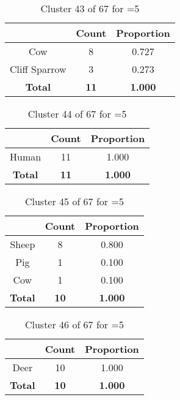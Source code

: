 \begin{table}[ht!]
\centering
\begin{tabular}{|c|c|c|}
\hline
\bf \Spec{} &\bf Count &\bf Proportion\\ \hline \hline
Cow & 8 & 0.727\\ \hline
Cliff Sparrow & 3 & 0.273\\ \hline
\hline
\bf Total & \bf 11 & \bf 1.000\\ \hline
\end{tabular}
\label{tab:cluster:43:5}
\caption{Cluster 43 of 67 for \minneigh{}=5}
\end{table}

\begin{table}[ht!]
\centering
\begin{tabular}{|c|c|c|}
\hline
\bf \Spec{} &\bf Count &\bf Proportion\\ \hline \hline
Human & 11 & 1.000\\ \hline
\hline
\bf Total & \bf 11 & \bf 1.000\\ \hline
\end{tabular}
\label{tab:cluster:44:5}
\caption{Cluster 44 of 67 for \minneigh{}=5}
\end{table}

\begin{table}[ht!]
\centering
\begin{tabular}{|c|c|c|}
\hline
\bf \Spec{} &\bf Count &\bf Proportion\\ \hline \hline
Sheep & 8 & 0.800\\ \hline
Pig & 1 & 0.100\\ \hline
Cow & 1 & 0.100\\ \hline
\hline
\bf Total & \bf 10 & \bf 1.000\\ \hline
\end{tabular}
\label{tab:cluster:45:5}
\caption{Cluster 45 of 67 for \minneigh{}=5}
\end{table}

\begin{table}[ht!]
\centering
\begin{tabular}{|c|c|c|}
\hline
\bf \Spec{} &\bf Count &\bf Proportion\\ \hline \hline
Deer & 10 & 1.000\\ \hline
\hline
\bf Total & \bf 10 & \bf 1.000\\ \hline
\end{tabular}
\label{tab:cluster:46:5}
\caption{Cluster 46 of 67 for \minneigh{}=5}
\end{table}

